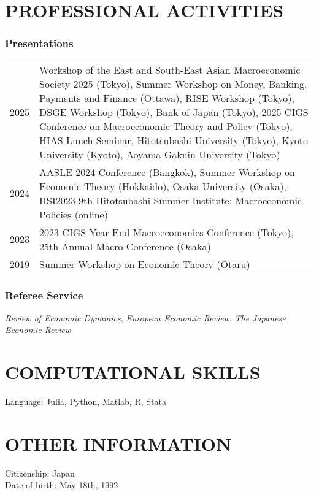 \documentclass[12pt]{article}
\begin{document}
\section*{PROFESSIONAL ACTIVITIES}
\subsubsection*{Presentations}
\begin{tabularx}{\linewidth}{@{}lX}
2025&Workshop of the East and South-East Asian Macroeconomic Society 2025 (Tokyo), Summer Workshop on Money, Banking, Payments and Finance (Ottawa), RISE Workshop (Tokyo), DSGE Workshop (Tokyo), Bank of Japan (Tokyo), 2025 CIGS Conference on Macroeconomic Theory and Policy (Tokyo), HIAS Lunch Seminar, Hitotsubashi University (Tokyo), Kyoto University (Kyoto), Aoyama Gakuin University (Tokyo)\\
2024&AASLE 2024 Conference (Bangkok), Summer Workshop on Economic Theory (Hokkaido), Osaka University (Osaka), HSI2023-9th Hitotsubashi Summer Institute: Macroeconomic Policies (online)\\
2023&2023 CIGS Year End Macroeconomics Conference (Tokyo), 25th Annual Macro Conference (Osaka)\\
2019&Summer Workshop on Economic Theory (Otaru)
\end{tabularx}
\subsubsection*{Referee Service}
\textit{Review of Economic Dynamics}, \textit{European Economic Review}, \textit{The Japanese Economic Review}

\section*{COMPUTATIONAL SKILLS}
Language: Julia, Python, Matlab, R, Stata

\section*{OTHER INFORMATION}
Citizenship: Japan\\
Date of birth: May 18th, 1992
\end{document}
